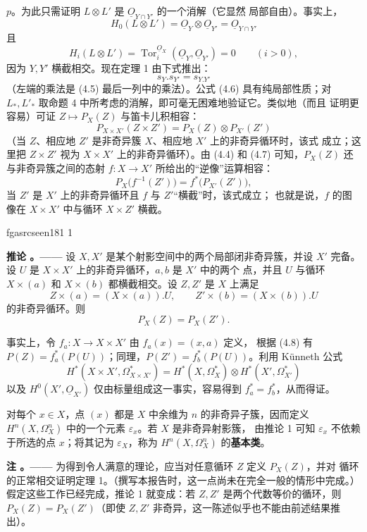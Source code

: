 \documentclass[12pt,twoside,openany]{book}
\numberwithin{equation}{section}
\newcommand{\fgaunitid}{unbound}
\newcommand{\src}[1]{%
  \phantomsection
  \hypertarget{src:\fgaunitid:#1}{}%
  \hypertarget{fga.\fgaunitid.p#1}{}%
  \ifcsname fgasrcseen#1\endcsname\else
    \expandafter\gdef\csname fgasrcseen#1\endcsname{1}%
    \hypertarget{src:#1}{}%
  \fi
  \marginpar{\raggedleft\footnotesize\sffamily #1}%
}
\newcommand{\Osh}{\underline{O}}
\newcommand{\fquote}[1]{“#1”}
\newcommand{\zhterm}[1]{\textbf{#1}}
\theoremstyle{plain}
\theoremstyle{definition}
\theoremstyle{remark}
\newcommand{\result}[2]{%
  \par\medskip\noindent\textbf{#1%
  \if\relax\detokenize{#2}\relax\else\space#2\fi。——}\enspace
}
\begin{document}
$p$。为此只需证明 $L\otimes L'$ 是 $\Osh_{Y\cap Y'}$ 的一个消解（它显然
局部自由）。事实上，
\[
  H_0(L\otimes L')=\Osh_Y\otimes\Osh_{Y'}=\Osh_{Y\cap Y'}
\]
且
\[
  H_i(L\otimes L')=\operatorname{Tor}_{i}^{\Osh_X}(\Osh_Y,\Osh_{Y'})=0
  \qquad(i>0),
\]
因为 $Y,Y'$ 横截相交。现在定理 1 由下式推出：
\begin{equation}\tag{4.6}
  s_Y.s_{Y'}=s_{Y.Y'}
\end{equation}
（左端的乘法是 (4.5) 最后一列中的乘法）。公式 (4.6) 具有纯局部性质；对
$L_{*},L'_{*}$ 取命题 4 中所考虑的消解，即可毫无困难地验证它。类似地（而且
证明更容易）可证 $Z\longmapsto P_X(Z)$ 与笛卡儿积相容：
\begin{equation}\tag{4.7}
  P_{X\times X'}(Z\times Z')=P_X(Z)\otimes P_{X'}(Z')
\end{equation}
（当 $Z$、相应地 $Z'$ 是非奇异簇 $X$、相应地 $X'$ 上的非奇异循环时，该式
成立；这里把 $Z\times Z'$ 视为 $X\times X'$ 上的非奇异循环）。由 (4.4)
和 (4.7) 可知，$P_X(Z)$ 还与非奇异簇之间的态射
$f:X\longrightarrow X'$ 所给出的\fquote{逆像}运算相容：
\begin{equation}\tag{4.8}
  P_X\bigl(f^{-1}(Z')\bigr)=f^{*}\bigl(P_{X'}(Z')\bigr),
\end{equation}
当 $Z'$ 是 $X'$ 上的非奇异循环且 $f$ 与 $Z'$\fquote{横截}时，该式成立；
也就是说，$f$ 的图像在 $X\times X'$ 中与循环 $X\times Z'$ 横截。

\src{181}
\result{推论}{1} 设 $X,X'$ 是某个射影空间中的两个局部闭非奇异簇，并设
$X'$ 完备。设 $U$ 是 $X\times X'$ 上的非奇异循环，$a,b$ 是 $X'$ 中的两个
点，并且 $U$ 与循环 $X\times(a)$ 和 $X\times(b)$ 都横截相交。设 $Z,Z'$ 是
$X$ 上满足
\[
  Z\times(a)=(X\times(a)).U,
  \qquad
  Z'\times(b)=(X\times(b)).U
\]
的非奇异循环。则
\[
  P_X(Z)=P_X(Z').
\]

事实上，令 $f_a:X\longrightarrow X\times X'$ 由 $f_a(x)=(x,a)$ 定义，
根据 (4.8) 有 $P(Z)=f_a^{*}(P(U))$；同理，$P(Z')=f_b^{*}(P(U))$。利用
Künneth 公式
\[
  H^{*}(X\times X',\Omega_{X\times X'}^{*})
  =H^{*}(X,\Omega_X^{*})\otimes H^{*}(X',\Omega_{X'}^{*})
\]
以及 $H^{0}(X',\Osh_{X'})$ 仅由标量组成这一事实，容易得到
$f_a^{*}=f_b^{*}$，从而得证。

对每个 $x\in X$，点 $(x)$ 都是 $X$ 中余维为 $n$ 的非奇异子簇，因而定义
$H^{n}(X,\Omega_X^{n})$ 中的一个元素 $\varepsilon_x$。若 $X$ 是非奇异射影簇，
由推论 1 可知 $\varepsilon_x$ 不依赖于所选的点 $x$；将其记为
$\varepsilon_X$，称为 $H^{n}(X,\Omega_X^{n})$ 的\zhterm{基本类}。

\result{注}{} 为得到令人满意的理论，应当对任意循环 $Z$ 定义 $P_X(Z)$，并对
循环的正常相交证明定理 1。（撰写本报告时，这一点尚未在完全一般的情形中完成。）
假定这些工作已经完成，推论 1 就变成：若 $Z,Z'$ 是两个代数等价的循环，则
$P_X(Z)=P_X(Z')$（即使 $Z,Z'$ 非奇异，这一陈述似乎也不能由前述结果推出）。
\end{document}
